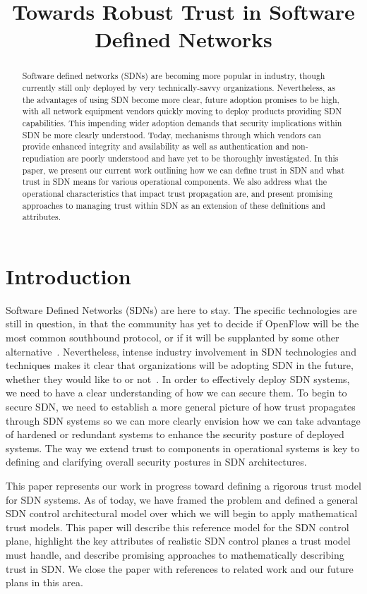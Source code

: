 \documentclass[10pt,conference]{IEEEtran}
\title{Towards Robust Trust in Software Defined Networks}
\begin{document}
\maketitle

\begin{abstract}
Software defined networks (SDNs) are becoming more popular in industry, though currently still only deployed by very technically-savvy organizations.  Nevertheless, as the advantages of using SDN become more clear, future adoption promises to be high, with all network equipment vendors quickly moving to deploy products providing SDN capabilities.  This impending wider adoption demands that security implications within SDN be more clearly understood.  Today, mechanisms through which vendors can provide enhanced integrity and availability as well as authentication and non-repudiation are poorly understood and have yet to be thoroughly investigated.  In this paper, we present our current work outlining how we can define trust in SDN and what trust in SDN means for various operational components.  We also address what the operational characteristics that impact trust propagation are, and present promising approaches to managing trust within SDN as an extension of these definitions and attributes.
\end{abstract}

\section{Introduction}
Software Defined Networks (SDNs) are here to stay. The specific technologies are still in question, in that the community has yet to decide if OpenFlow will be the most common southbound protocol, or if it will be supplanted by some other alternative~\cite{rfc6241}.  Nevertheless, intense industry involvement in SDN technologies and techniques makes it clear that organizations will be adopting SDN in the future, whether they would like to or not~\cite{opendaylight}.  In order to effectively deploy SDN systems, we need to have a clear understanding of how we can secure them.  To begin to secure SDN, we need to establish a more general picture of how trust propagates through SDN systems so we can more clearly envision how we can take advantage of hardened or redundant systems to enhance the security posture of deployed systems.  The way we extend trust to components in operational systems is key to defining and clarifying overall security postures in SDN architectures.

This paper represents our work in progress toward defining a rigorous trust model for SDN systems.  As of today, we have framed the problem and defined a general SDN control architectural model over which we will begin to apply mathematical trust models.  This paper will describe this reference model for the SDN control plane, highlight the key attributes of realistic SDN control planes a trust model must handle, and describe promising approaches to mathematically describing trust in SDN.  We close the paper with references to related work and our future plans in this area.
\end{document}
